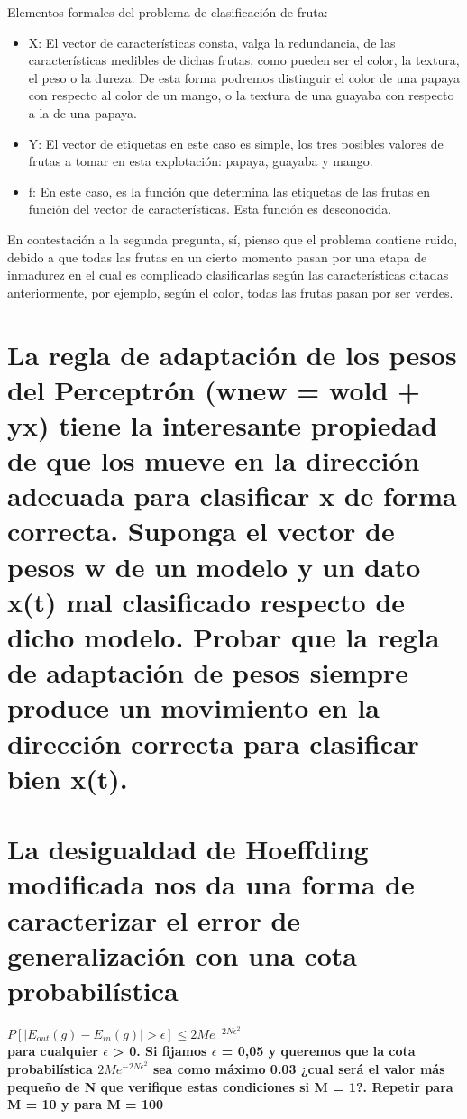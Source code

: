 Elementos formales del problema de clasificación de fruta: 
\begin{itemize}
	\item X: El vector de características consta, valga la redundancia, de las características medibles de dichas frutas, como pueden ser el color, la textura, el peso o la dureza. De esta forma podremos distinguir el color de una papaya con respecto al color de un mango, o la textura de una guayaba con respecto a la de una papaya.
	\item Y: El vector de etiquetas en este caso es simple, los tres posibles valores de frutas a tomar en esta explotación: papaya, guayaba y mango.
	\item f: En este caso, es la función que determina las etiquetas de las frutas en función del vector de características. Esta función es desconocida.
\end{itemize}

En contestación a la segunda pregunta, sí, pienso que el problema contiene ruido, debido a que todas las frutas en un cierto momento pasan por una etapa de inmadurez en el cual es complicado clasificarlas según las características citadas anteriormente, por ejemplo, según el color, todas las frutas pasan por ser verdes.

\section{La regla de adaptación de los pesos del Perceptrón (wnew = wold + yx) tiene la interesante propiedad de que los mueve en la dirección adecuada para clasificar x de forma correcta. Suponga el vector de pesos w de un modelo y un dato x(t) mal clasificado respecto de dicho modelo. Probar que la regla de adaptación de pesos siempre produce un movimiento en la dirección correcta para clasificar bien x(t). }


\section{La desigualdad de Hoeffding modificada nos da una forma de caracterizar el error de generalización con una cota probabilística}


\hspace{4cm} $P[|E_{out}(g) - E_{in}(g)| > \epsilon] \leq 2Me^{-2N \epsilon ^{2}}$ \\

\textbf{para cualquier $\epsilon$ > 0. Si fijamos $\epsilon$ = 0,05 y queremos que la cota probabilística $2Me^{-2N \epsilon ^{2}}$ sea como máximo 0.03 ¿cual será el valor más pequeño de N que verifique estas condiciones si M = 1?. Repetir para M = 10 y para M = 100}

